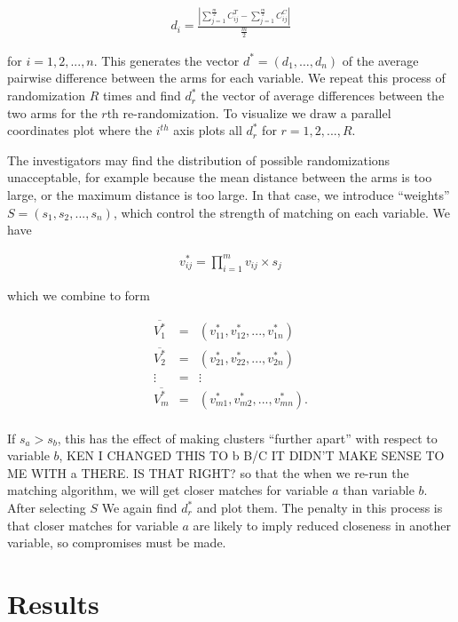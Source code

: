 \documentclass[]{article}
\begin{document}
\begin{eqnarray*}
 d_i = \frac{| \sum_{j = 1}^{\frac{m}{2}}C_{ij}^T - \sum_{j = 1}^{\frac{m}{2}}C_{ij}^C |}{\frac{m}{2}} 
\end{eqnarray*}

for \(i = 1, 2, ..., n.\) This generates the vector
\(d^* = (d_1, \ldots, d_n)\) of the average pairwise difference between
the arms for each variable. We repeat this process of randomization
\(R\) times and find \(d^*_r\) the vector of average differences between
the two arms for the \(r\)th re-randomization. To visualize we draw a
parallel coordinates plot where the \(i^{th}\) axis plots all \(d^*_r\)
for \(r = 1, 2, ..., R.\)

The investigators may find the distribution of possible randomizations
unacceptable, for example because the mean distance between the arms is
too large, or the maximum distance is too large. In that case, we
introduce ``weights'' \(S = (s_{1}, s_{2},..., s_{n})\), which control
the strength of matching on each variable. We have

\begin{eqnarray*}
 v_{ij}^* = \prod_{i=1}^{m} v_{ij} \times s_j
\end{eqnarray*}

which we combine to form

\begin{eqnarray*}
 \overline{V_1^*} & = & (v_{11}^*, v_{12}^*,..., v_{1n}^*) \\
 \overline{V_2^*} & = & (v_{21}^*, v_{22}^*,..., v_{2n}^*) \\
 \vdots & = & \vdots\\    
 \overline{V_m^*} & = & (v_{m1}^*, v_{m2}^*,..., v_{mn}^*) .\\
\end{eqnarray*}

If \(s_a > s_b\), this has the effect of making clusters ``further
apart'' with respect to variable \(b\), KEN I CHANGED THIS TO b B/C IT
DIDN'T MAKE SENSE TO ME WITH a THERE. IS THAT RIGHT? so that the when we
re-run the matching algorithm, we will get closer matches for variable
\(a\) than variable \(b\). After selecting \(S\) We again find \(d^*_r\)
and plot them. The penalty in this process is that closer matches for
variable \(a\) are likely to imply reduced closeness in another
variable, so compromises must be made.

\section{Results}\label{results}
\end{document}
